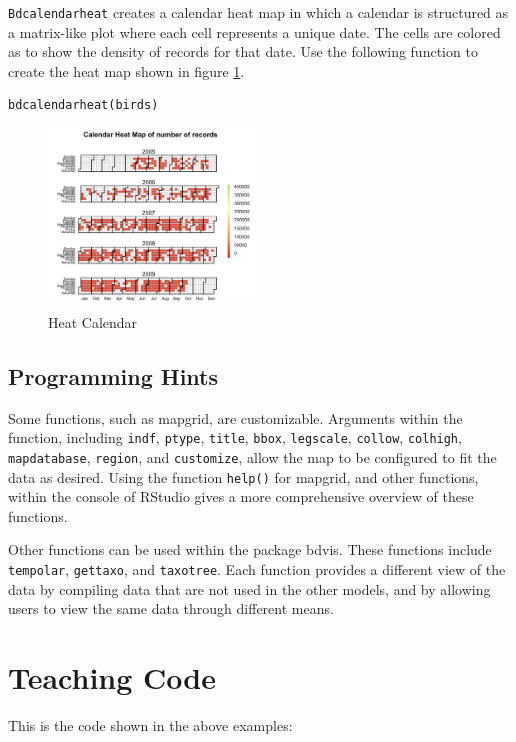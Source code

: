 \texttt{Bdcalendarheat} creates a calendar heat map in which a calendar is structured as a matrix-like plot where each cell represents a unique date.
The cells are colored as to show the density of records for that date.
Use the following function to create the heat map shown in figure \ref{fig:heatcal}.

\begin{lstlisting}[morekeywords={bdcalendarheat}]
bdcalendarheat(birds)
\end{lstlisting}

\begin{figure}[htbp!] 
   \centering
   \includegraphics[width=0.5\textwidth]{pictures/biodiversity/heatmap.jpg} 
      \caption{Heat Calendar}
   \label{fig:heatcal}
\end{figure} 

 \subsection{Programming Hints}
 
 Some functions, such as mapgrid, are customizable.
 Arguments within the function, including \texttt{indf}, \texttt{ptype}, \texttt{title}, \texttt{bbox}, \texttt{legscale}, \texttt{collow}, \texttt{colhigh}, \texttt{mapdatabase}, \texttt{region}, and \texttt{customize}, allow the map to be configured to fit the data as desired.
 Using the function \texttt{help()} for mapgrid, and other functions, within the console of RStudio gives a more comprehensive overview of these functions. 
 
 Other functions can be used within the package bdvis.
 These functions include \texttt{tempolar}, \texttt{gettaxo}, and \texttt{taxotree}.
 Each function provides a different view of the data by compiling data that are not used in the other models, and by allowing users to view the same data through different means.
 

\section{Teaching Code}
This is the code shown in the above examples:


